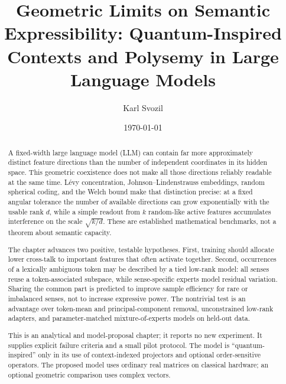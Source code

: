 \documentclass[
  aps,
  reprint,
  superscriptaddress,
  floatfix,
  nofootinbib,
  longbibliography
]{revtex4-2}
\begin{document}
\title{Geometric Limits on Semantic Expressibility: Quantum-Inspired Contexts and Polysemy in Large Language Models}

\author{Karl Svozil}

\date{\today}

\begin{abstract}
A fixed-width large language model (LLM) can contain far more approximately
distinct feature directions than the number of independent coordinates in its
hidden space.  This geometric coexistence does not make all those directions
reliably readable at the same time.  L\'evy concentration,
Johnson--Lindenstrauss embeddings, random spherical coding, and the Welch bound
make that distinction precise: at a fixed angular tolerance the number of
available directions can grow exponentially with the usable rank $d$, while a
simple readout from $k$ random-like active features accumulates interference on
the scale $\sqrt{k/d}$.  These are established mathematical benchmarks, not a
theorem about semantic capacity.

The chapter advances two positive, testable hypotheses.  First, training should
allocate lower cross-talk to important features that often activate together.
Second, occurrences of a lexically ambiguous token may be described by a tied
low-rank model: all senses reuse a token-associated subspace, while
sense-specific experts model residual variation.  Sharing the common part is
predicted to improve sample efficiency for rare or imbalanced senses, not to
increase expressive power.  The nontrivial test is an advantage over token-mean
and principal-component removal, unconstrained low-rank adapters, and
parameter-matched mixture-of-experts models on held-out data.

This is an analytical and model-proposal chapter; it reports no new experiment.
It supplies explicit failure criteria and a small pilot protocol.  The model is
``quantum-inspired'' only in its use of context-indexed projectors and optional
order-sensitive operators.  The proposed model uses ordinary real matrices on
classical hardware; an optional geometric comparison uses complex vectors.
\end{abstract}

\maketitle
\end{document}
